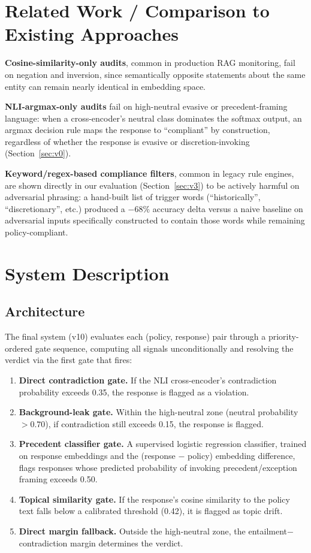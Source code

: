 \documentclass[11pt]{article}
\begin{document}
\section{Related Work / Comparison to Existing Approaches}
\label{sec:related}

\textbf{Cosine-similarity-only audits}, common in production RAG monitoring,
fail on negation and inversion, since semantically opposite statements about
the same entity can remain nearly identical in embedding space.

\textbf{NLI-argmax-only audits} fail on high-neutral evasive or
precedent-framing language: when a cross-encoder's neutral class dominates
the softmax output, an argmax decision rule maps the response to
``compliant'' by construction, regardless of whether the response is
evasive or discretion-invoking (Section~\ref{sec:v0}).

\textbf{Keyword/regex-based compliance filters}, common in legacy rule
engines, are shown directly in our evaluation (Section~\ref{sec:v3}) to be
actively harmful on adversarial phrasing: a hand-built list of trigger words
(``historically'', ``discretionary'', etc.) produced a $-68\%$ accuracy
delta versus a naive baseline on adversarial inputs specifically constructed
to contain those words while remaining policy-compliant.

\section{System Description}
\label{sec:system}

\subsection{Architecture}

The final system (v10) evaluates each (policy, response) pair through a
priority-ordered gate sequence, computing all signals unconditionally and
resolving the verdict via the first gate that fires:

\begin{enumerate}
\item \textbf{Direct contradiction gate.} If the NLI cross-encoder's
contradiction probability exceeds 0.35, the response is flagged as a
violation.
\item \textbf{Background-leak gate.} Within the high-neutral zone
(neutral probability $> 0.70$), if contradiction still exceeds 0.15, the
response is flagged.
\item \textbf{Precedent classifier gate.} A supervised logistic regression
classifier, trained on response embeddings and the (response $-$ policy)
embedding difference, flags responses whose predicted probability of
invoking precedent/exception framing exceeds 0.50.
\item \textbf{Topical similarity gate.} If the response's cosine similarity
to the policy text falls below a calibrated threshold (0.42), it is flagged
as topic drift.
\item \textbf{Direct margin fallback.} Outside the high-neutral zone, the
entailment$-$contradiction margin determines the verdict.
\end{enumerate}
\end{document}
